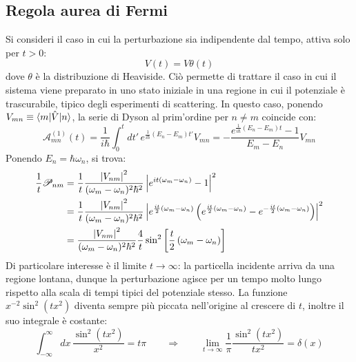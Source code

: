 \subsection{Regola aurea di Fermi}

Si consideri il caso in cui la perturbazione sia indipendente dal tempo, attiva solo per $ t > 0 $:
\begin{equation}
	V(t) = V \theta(t)
	\label{eq:5.24}
\end{equation}
dove $ \theta $ è la distribuzione di Heaviside. Ciò permette di trattare il caso in cui il sistema viene preparato in uno stato iniziale in una regione in cui il potenziale è trascurabile, tipico degli esperimenti di scattering. In questo caso, ponendo $ V_{mn} \equiv \braket{m | \hat{V} | n} $, la serie di Dyson al prim'ordine per $ n \neq m $ coincide con:
\begin{equation*}
	\mathscr{A}^{(1)}_{mn}(t) = \frac{1}{i\hbar} \int_0^t dt'\, e^{\frac{1}{i\hbar} \left( E_n - E_m \right) t'} V_{mn} = - \frac{e^{\frac{1}{i\hbar} \left( E_n - E_m \right) t} - 1}{E_m - E_n} V_{mn}
\end{equation*}
Ponendo $ E_n = \hbar \omega_n $, si trova:
\begin{equation*}
	\begin{split}
		\frac{1}{t} \mathscr{P}_{nm}
		&= \frac{1}{t} \frac{\left\lvert V_{nm}\right\rvert^2}{(\omega_m - \omega_n)^2 \hbar^2} \left\lvert e^{it \left( \omega_m - \omega_n \right)} - 1\right\rvert^2 \\
		&= \frac{1}{t} \frac{\left\lvert V_{nm}\right\rvert^2}{(\omega_m - \omega_n)^2 \hbar^2} \left\lvert e^{\frac{it}{2} \left( \omega_m - \omega_n \right)} \left( e^{\frac{it}{2} \left( \omega_m - \omega_n \right)} - e^{-\frac{it}{2} \left( \omega_m - \omega_n \right)} \right)\right\rvert^2 \\
		&= \frac{\left\lvert V_{nm}\right\rvert^2}{(\omega_m - \omega_n)^2 \hbar^2} \frac{4}{t} \sin^2 \left[ \frac{t}{2} \left( \omega_m - \omega_n \right) \right]
	\end{split}
\end{equation*}
Di particolare interesse è il limite $ t \rightarrow \infty $: la particella incidente arriva da una regione lontana, dunque la perturbazione agisce per un tempo molto lungo rispetto alla scala di tempi tipici del potenziale stesso. La funzione $ x^{-2} \sin^2 (tx^2) $ diventa sempre più piccata nell'origine al crescere di $ t $, inoltre il suo integrale è costante:
\begin{equation*}
	\int_{-\infty}^{\infty} dx\, \frac{\sin^2 (tx^2)}{x^2} = t\pi
	\qquad \Rightarrow \qquad
	\lim_{t \rightarrow \infty} \frac{1}{\pi} \frac{\sin^2 (tx^2)}{tx^2} = \delta(x)
\end{equation*}
